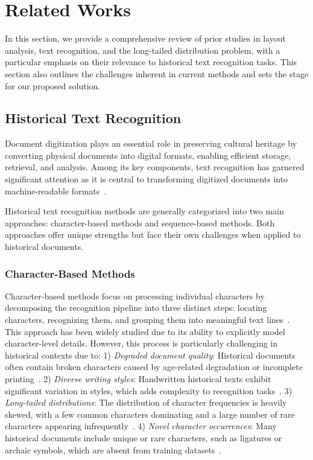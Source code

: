 \section{Related Works}
\label{sec:related_works}

In this section, we provide a comprehensive review of prior studies in layout analysis, text recognition, and the long-tailed distribution problem, with a particular emphasis on their relevance to historical text recognition tasks. This section also outlines the challenges inherent in current methods and sets the stage for our proposed solution.

\subsection{Historical Text Recognition}

Document digitization plays an essential role in preserving cultural heritage by converting physical documents into digital formats, enabling efficient storage, retrieval, and analysis. Among its key components, text recognition has garnered significant attention as it is central to transforming digitized documents into machine-readable formats~\cite{jla}. 

Historical text recognition methods are generally categorized into two main approaches: character-based methods and sequence-based methods. Both approaches offer unique strengths but face their own challenges when applied to historical documents.

\subsubsection{Character-Based Methods}
Character-based methods focus on processing individual characters by decomposing the recognition pipeline into three distinct steps: locating characters, recognizing them, and grouping them into meaningful text lines~\cite{papytwin}. This approach has been widely studied due to its ability to explicitly model character-level details. However, this process is particularly challenging in historical contexts due to: 
1) \textit{Degraded document quality}: Historical documents often contain broken characters caused by age-related degradation or incomplete printing~\cite{broken}.
2) \textit{Diverse writing styles}: Handwritten historical texts exhibit significant variation in styles, which adds complexity to recognition tasks~\cite{obc306}.
3) \textit{Long-tailed distributions}: The distribution of character frequencies is heavily skewed, with a few common characters dominating and a large number of rare characters appearing infrequently~\cite{fewran}.
4) \textit{Novel character occurrences}: Many historical documents include unique or rare characters, such as ligatures or archaic symbols, which are absent from training datasets~\cite{hde,ligarature}.


